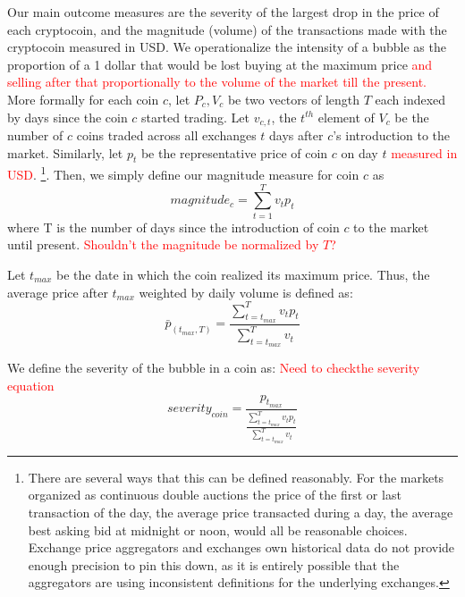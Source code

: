 Our main outcome measures are the severity of the largest drop in the price of each cryptocoin, and the magnitude (volume) of the transactions made with the cryptocoin measured in USD.
We operationalize the intensity of a bubble as the proportion of a 1 dollar that would be lost buying at the maximum price \textcolor{red}{and selling after that proportionally to the volume of the market till the present.}
More formally for each coin $c$, let $P_c,V_c$ be two vectors of length $T$ each indexed by days since the coin $c$ started trading.
Let $v_{c,t}$, the $t^{th}$ element of $V_c$ be the number of $c$ coins traded across all exchanges $t$ days after $c$'s introduction to the market. 
Similarly, let $p_t$ be the representative price of coin $c$ on day $t$ \textcolor{red}{measured in USD}. \footnote{There are several ways that this can be defined reasonably. For the markets organized as continuous double auctions the price of the first or last transaction of the day,  the average price transacted during a day, the average best asking bid at midnight or noon, would all be reasonable choices. Exchange price aggregators and exchanges own historical data do not provide enough precision to pin this down, as it is entirely possible that the aggregators are using inconsistent definitions for the underlying exchanges.}. Then, we simply define our magnitude measure for coin $c$ as
\begin{equation}
magnitude_{c} = \sum_{t=1}^{T} v_t  p_t
\end{equation}
where T is the number of days since the introduction of coin $c$ to the market until present. \textcolor{red}{Shouldn't the magnitude be normalized by $T$?}


Let $t_{max}$ be the date in which the coin realized its maximum price. Thus, the average price after $t_{max}$ weighted by daily volume is defined as:
\begin{equation}
\bar{p}_{(t_{max},T)} = \frac{\sum_{t=t_{max}}^{T} v_t p_t} {\sum_{t=t_{max}}^{T} v_t}
\end{equation}

We define the severity of the bubble in a coin as: \textcolor{red}{Need to checkthe severity equation}
\begin{equation}
severity_{coin} = \frac{ p_{t_{max}}} {\frac{\sum_{t=t_{max}}^{T} v_t p_t} {\sum_{t=t_{max}}^{T} v_t} }
\end{equation}
